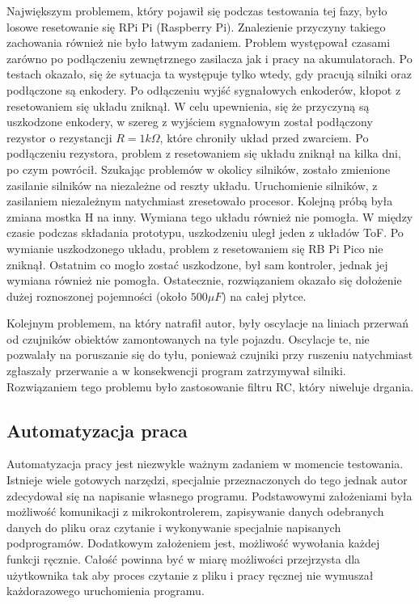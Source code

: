         Największym problemem, który pojawił się podczas testowania tej fazy, było losowe resetowanie się RPi Pi (Raspberry Pi).
        Znalezienie przyczyny takiego zachowania również nie było łatwym zadaniem.
        Problem występował czasami zarówno po podłączeniu zewnętrznego zasilacza jak i pracy na akumulatorach.
        Po testach okazało, się że sytuacja ta występuje tylko wtedy, gdy pracują silniki oraz podłączone są enkodery.
        Po odłączeniu wyjść sygnałowych enkoderów, kłopot z resetowaniem się układu zniknął.
        W celu upewnienia, się że przyczyną są uszkodzone enkodery, w szereg z wyjściem sygnałowym został podłączony rezystor o rezystancji $R =1k\Omega$, które chroniły układ przed zwarciem.
        Po podłączeniu rezystora, problem z resetowaniem się układu zniknął na kilka dni, po czym powrócił.
        Szukając problemów w okolicy silników, zostało zmienione zasilanie silników na niezależne od reszty układu.
        Uruchomienie silników, z zasilaniem niezależnym natychmiast zresetowało procesor.
        Kolejną próbą była zmiana mostka H na inny. Wymiana tego układu również nie pomogła.
        W między czasie podczas składania prototypu, uszkodzeniu uległ jeden z układów ToF.
        Po wymianie uszkodzonego układu, problem z resetowaniem się RB Pi Pico nie zniknął.
        Ostatnim co mogło zostać uszkodzone, był sam kontroler, jednak jej wymiana również nie pomogła.
        Ostatecznie, rozwiązaniem okazało się dołożenie dużej roznoszonej pojemności (około $500\mu F$) na całej płytce.

        Kolejnym problemem, na który natrafił autor, były oscylacje na liniach przerwań od czujników obiektów zamontowanych na tyle pojazdu.
        Oscylacje te, nie pozwalały na poruszanie się do tyłu, ponieważ czujniki przy ruszeniu natychmiast zgłaszały przerwanie a w konsekwencji program zatrzymywał silniki.
        Rozwiązaniem tego problemu było zastosowanie filtru RC, który niweluje drgania.



    \subsection{Automatyzacja praca}
        Automatyzacja pracy jest niezwykle ważnym zadaniem w momencie testowania.
        Istnieje wiele gotowych narzędzi, specjalnie przeznaczonych do tego jednak autor zdecydował się na napisanie własnego programu.
        Podstawowymi założeniami była możliwość komunikacji z mikrokontrolerem, zapisywanie danych odebranych danych do pliku oraz czytanie i wykonywanie specjalnie napisanych podprogramów.
        Dodatkowym założeniem jest, możliwość wywołania każdej funkcji ręcznie.
        Całość powinna być w miarę możliwości przejrzysta dla użytkownika tak aby proces czytanie z pliku i pracy ręcznej nie wymuszał każdorazowego uruchomienia programu.

